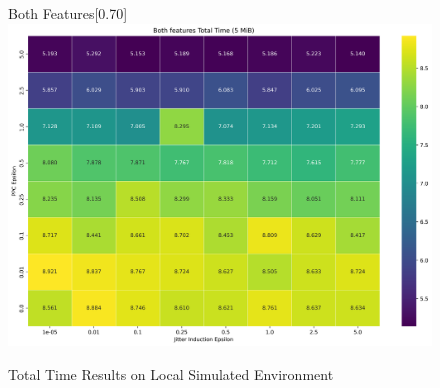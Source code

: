 \begin{figure}[htbp]
\begin{subcaptionbox}{Both Features\label{fig:local_both_total_time}}[0.70\textwidth]
        {\includegraphics[width=\linewidth]{Chapters/Figures/Plots/local_total_time_50_heatmap_5mib.png}}
    \end{subcaptionbox}
    \caption{Total Time Results on Local Simulated Environment}\label{fig:local_total_time}
\end{figure}


